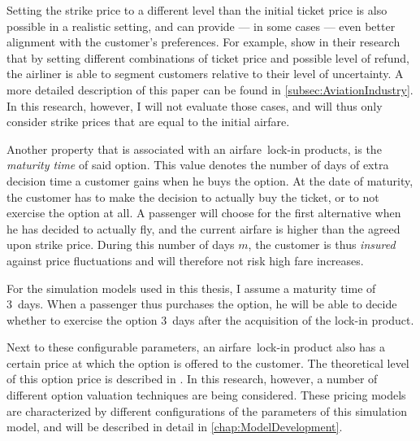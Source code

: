 Setting the strike price to a different level than the initial ticket price is also possible in a realistic setting, and can provide --- in some cases --- even better alignment with the customer's preferences. For example,  show in their research that by setting different combinations of ticket price and possible level of refund, the airliner is able to segment customers relative to their level of uncertainty. A more detailed description of this paper can be found in \autoref{subsec:AviationIndustry}. In this research, however, I will not evaluate those cases, and will thus only consider strike prices that are equal to the initial airfare.


Another property that is associated with an airfare~lock-in products, is the \emph{maturity time} of said option. This value denotes the number of days of extra decision time a customer gains when he buys the option. At the date of maturity, the customer has to make the decision to actually buy the ticket, or to not exercise the option at all. A passenger will choose for the first alternative when he has decided to actually fly, and the current airfare is higher than the agreed upon strike price. During this number of days $m$, the customer is thus \emph{insured} against price fluctuations and will therefore not risk high fare increases.

For the simulation models used in this thesis, I assume a maturity time of 3~days. When a passenger thus purchases the option, he will be able to decide whether to exercise the option 3~days after the acquisition of the lock-in product.

Next to these configurable parameters, an airfare~lock-in product also has a certain price at which the option is offered to the customer. The theoretical level of this option price is described in . In this research, however, a number of different option valuation techniques are being considered. These pricing models are characterized by different configurations of the parameters of this simulation model, and will be described in detail in \autoref{chap:ModelDevelopment}.

